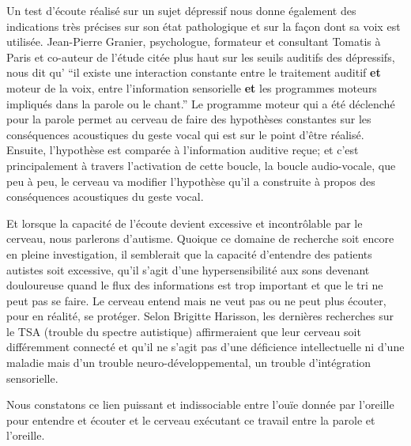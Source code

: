 

Un test d'écoute réalisé sur un sujet dépressif nous donne également des indications
très précises sur son état
pathologique et sur la façon dont sa voix est utilisée. Jean-Pierre
Granier, psychologue, formateur et consultant Tomatis à Paris et
co-auteur de l'étude citée plus haut sur les seuils auditifs des dépressifs, nous dit qu' 
``il existe une 
interaction
constante entre le traitement auditif \textbf{et} moteur de la
voix, entre l'information sensorielle \textbf{et} les programmes moteurs impliqués
dans la parole ou le chant.'' Le programme moteur qui a été déclenché
pour la parole permet au cerveau de faire des hypothèses constantes
sur les conséquences acoustiques du geste vocal qui est sur le point
d'être réalisé. Ensuite, l'hypothèse est comparée à l'information
auditive reçue; et c'est principalement à travers l'activation de cette boucle, la
boucle audio-vocale, que peu à peu, le cerveau va modifier l'hypothèse
qu'il a construite à propos des conséquences acoustiques du geste vocal.





Et lorsque la capacité de l'écoute devient excessive et incontrôlable par le cerveau, nous 
parlerons d'autisme. Quoique
  ce domaine de recherche  soit encore en pleine investigation, il semblerait que la capacité 
  d'entendre des patients autistes soit excessive, qu'il s'agit d'une hypersensibilité aux sons 
  devenant douloureuse quand  le flux des informations est trop important et que le tri ne 
  peut pas se faire. Le cerveau entend mais ne veut pas ou ne peut plus  écouter, pour en 
  réalité, se protéger.
Selon Brigitte Harisson,  
 les dernières recherches sur le TSA (trouble du spectre autistique) affirmeraient que leur
  cerveau soit différemment connecté et qu'il ne s'agit pas d'une déficience intellectuelle ni
   d'une maladie mais d'un trouble neuro-développemental, un trouble
  d'intégration sensorielle.\autocite[Cet ouvrage propose une description unique du TSA
   (trouble du spectre de l'autisme pp. 22--23)]{harrisson.st-charles:lautisme}

Nous constatons ce lien puissant et indissociable  entre l'ouïe donnée
par l'oreille pour entendre et écouter et le cerveau exécutant ce
travail entre la 
parole et l'oreille.








